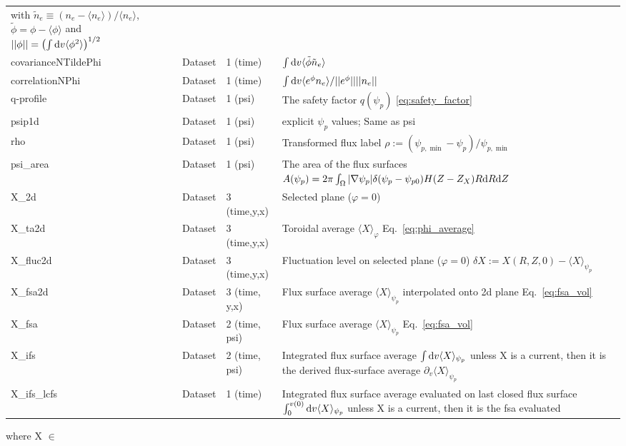 \begin{longtable}{lll>{\RaggedRight}p{7cm}}
with $\tilde n_e \equiv (n_e - \langle n_e \rangle)/\langle n_e\rangle$, 
$\tilde\phi = \phi - \langle\phi\rangle$
and $||\phi|| = \left( \int \mathrm{d} v \langle \phi^2 \rangle\right)^{1/2}$
\\
covarianceNTildePhi  & Dataset & 1 (time) & $ \int\mathrm{d} v \langle \tilde \phi \tilde n_e\rangle $
\\
correlationNPhi  & Dataset & 1 (time) & $\int\mathrm{d} v \langle e^\phi n_e\rangle/ ||e^\phi||||n_e||$\\
q-profile        & Dataset & 1 (psi) & The safety factor $q(\psi_p)$ \eqref{eq:safety_factor} \\
psip1d           & Dataset & 1 (psi) & explicit $\psi_p$ values; Same as psi \\
rho              & Dataset & 1 (psi) & Transformed flux label $\rho:= (\psi_{p,\min} - \psi_p)/\psi_{p,\min}$ \\
psi\_area        & Dataset & 1 (psi) & The area of the flux surfaces $A(\psi_p) = 2\pi \int_\Omega |\nabla\psi_p| \delta(\psi_p - \psi_{p0}) H(Z-Z_X) R\mathrm{d} R\mathrm{d} Z$ \\
X\_2d            & Dataset & 3 (time,y,x) & Selected plane ($\varphi=0$) \\
X\_ta2d          & Dataset & 3 (time,y,x) & Toroidal average $\langle X
    \rangle_\varphi$ Eq.~\eqref{eq:phi_average} \\
X\_fluc2d        & Dataset & 3 (time,y,x) & Fluctuation level on selected plane ($\varphi= 0$) $\delta X := X(R,Z,0) - \langle X\rangle_{\psi_{p}}$ \\
X\_fsa2d         & Dataset & 3 (time, y,x) & Flux surface average $\langle X\rangle_{\psi_p}$ interpolated onto 2d plane Eq.~\eqref{eq:fsa_vol} \\
X\_fsa           & Dataset & 2 (time, psi) & Flux surface average $\langle X\rangle_{\psi_p}$ Eq.~\eqref{eq:fsa_vol} \\
X\_ifs           & Dataset & 2 (time, psi) & Integrated flux surface average $\int\mathrm{d} v\langle X\rangle_{\psi_p}$ unless X is a current, then it is the derived flux-surface average $\partial_v \langle X\rangle_{\psi_p}$ \\
X\_ifs\_lcfs     & Dataset & 1 (time) & Integrated flux surface average evaluated on last closed flux surface $\int_0^{v(0)}\mathrm{d} v\langle X\rangle_{\psi_p}$ unless X is a current, then it is the fsa evaluated \\
\bottomrule
\end{longtable}
where X $\in$
